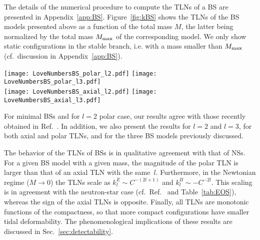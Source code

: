 \documentclass[aps,twocolumn,showpacs,preprintnumbers,nofootinbib,prd,superscriptaddress,groupedaddress,10pt]{revtex4-1}
\begin{document}
The details of the numerical procedure to compute the TLNs of a BS are presented in Appendix~\ref{app:BS}.
Figure~\ref{fig:kBS} shows the TLNs of the BS models presented above as a function of the total mass $M$, the latter being normalized by the total mass $M_{\rm max}$ of the corresponding model. We only show static configurations in the stable branch, i.e. with a mass smaller than $M_{\rm max}$ (cf.\ discussion in Appendix~\ref{app:BS}).
%
\begin{figure*}[ht]
\texttt{[image: LoveNumbersBS\_polar\_l2.pdf]}\qquad
\texttt{[image: LoveNumbersBS\_polar\_l3.pdf]}\\
\texttt{[image: LoveNumbersBS\_axial\_l2.pdf]}\qquad
\texttt{[image: LoveNumbersBS\_axial\_l3.pdf]}
\caption{Polar (top panels) and axial (bottom panels) TLNs for minimal, massive and solitonic BSs. Left and right panels refers to $l=2$ and $l=3$, respectively. For massive and solitonic BSs we have considered $\alpha=10^4\mu^2$ and $\sigma_0=0.05$, respectively. With these values, the maximum mass scales approximately as shown in Table~\ref{tab:BSs}. Numerical data are available online~\cite{webpage}. These plots include only stars in the stable branch.}\label{fig:kBS}
\end{figure*}
%
For minimal BSs and for $l=2$ polar case, our results agree with those recently obtained in Ref.~\cite{Mendes:2016vdr}.
In addition, we also present the results for $l=2$ and $l=3$, for both axial and polar TLNs, and for the three BS models previously discussed. 
%

The behavior of the TLNs of BSs is in qualitative agreement with that of NSs. For a given BS model with a given mass, the magnitude of the polar TLN is larger than that of an axial TLN with the same~$l$. Furthermore, in the Newtonian regime ($M\to0$) the TLNs scale as $k_l^E\sim C^{-(2l+1)}$ and $k_l^B\sim -C^{-2l}$. This scaling is in agreement with the neutron-star case (cf.\ Ref.~\cite{Binnington:2009bb} and Table~\ref{tab:EOS}), whereas the sign of the axial TLNs is opposite. Finally, all TLNs are monotonic functions of the compactness, so that more compact configurations have smaller tidal deformability. The phenomenological implications of these results are discussed in Sec.~\ref{sec:detectability}.


\end{document}
